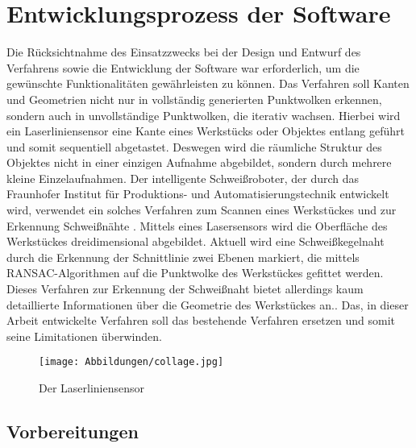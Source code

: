 

\chapter{Entwicklungsprozess der Software}
Die Rücksichtnahme des Einsatzzwecks bei der Design und Entwurf des Verfahrens sowie die Entwicklung der Software war erforderlich, um die gewünschte Funktionalitäten gewährleisten zu können. Das Verfahren soll Kanten und Geometrien nicht nur in vollständig generierten Punktwolken erkennen, sondern auch in unvollständige Punktwolken, die iterativ wachsen. Hierbei wird ein Laserliniensensor eine Kante eines Werkstücks oder Objektes entlang geführt und somit sequentiell abgetastet. Deswegen wird die räumliche Struktur des Objektes nicht in einer einzigen Aufnahme abgebildet, sondern durch mehrere kleine Einzelaufnahmen. Der intelligente Schweißroboter, der durch das Fraunhofer Institut für Produktions- und Automatisierungstechnik entwickelt wird, verwendet ein solches Verfahren zum Scannen eines Werkstückes und zur Erkennung Schweißnähte \autocite[39]{savla_intelligente_2022}. Mittels eines Lasersensors wird die Oberfläche des Werkstückes dreidimensional abgebildet. Aktuell wird eine Schweißkegelnaht durch die Erkennung der Schnittlinie zwei Ebenen markiert, die mittels RANSAC-Algorithmen auf die Punktwolke des Werkstückes gefittet werden. Dieses Verfahren zur Erkennung der Schweißnaht bietet allerdings kaum detaillierte Informationen über die Geometrie des Werkstückes an.\autocite[39-52]{savla_intelligente_2022}. Das, in dieser Arbeit entwickelte Verfahren soll das bestehende Verfahren ersetzen und somit seine Limitationen überwinden.

\begin{figure}[h]
	\texttt{[image: Abbildungen/collage.jpg]}
	\centering
	\caption{Der Laserliniensensor} 
\end{figure}

\section{Vorbereitungen}
